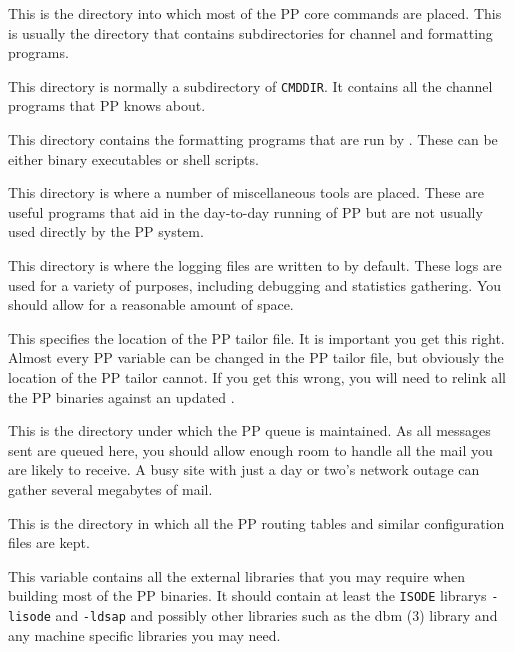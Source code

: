 \begin{describe}
\item[\verb|CMDDIR|:] This is the directory into which
most of the PP core commands are placed. This is usually the directory
that contains subdirectories for channel and formatting programs.

\item[\verb|CHANDIR|:] This directory is normally a
subdirectory of \verb|CMDDIR|. It contains all the channel programs
that PP knows about.

\item[\verb|FORMDIR|:] This directory contains the
formatting programs that are run by . These can be
either binary executables or shell scripts.

\item[\verb|TOOLDIR|:] This directory is where a number
of miscellaneous tools are placed. These are useful programs that aid
in the day-to-day running of PP but are not usually used directly by the PP
system.

\item[\verb|LOGDIR|:] This directory is where the
logging files are written to by default. These logs are used for a
variety of purposes, including debugging and statistics gathering. You
should allow for a reasonable amount of space.

\item[\verb|TAILOR|:] This specifies the location of
the PP tailor file. It is important you get this right. Almost
every PP variable can be changed in the PP tailor file, but
obviously the location of the PP tailor cannot. If you get this wrong,
you will need to relink all the PP binaries against an updated
.

\item[\verb|QUEDIR|:] This is the directory under which
the PP queue is maintained. As all messages sent are queued here, you
should allow enough room to handle all the mail you are likely to
receive. A busy site with just a day or two's network outage can
gather several megabytes of mail.

\item[\verb|TBLDIR|:] This is the directory in which all
the PP routing tables and similar configuration files are kept.

\item[\verb|LIBSYS|:] This variable contains all the
external libraries that you may require when building most of the PP
binaries. It should contain at least the \verb|ISODE| librarys
{\verb|-lisode|} and \verb|-ldsap| and possibly other libraries such
as the \man dbm (3) library and any machine specific libraries you may
need.


\end{describe}
